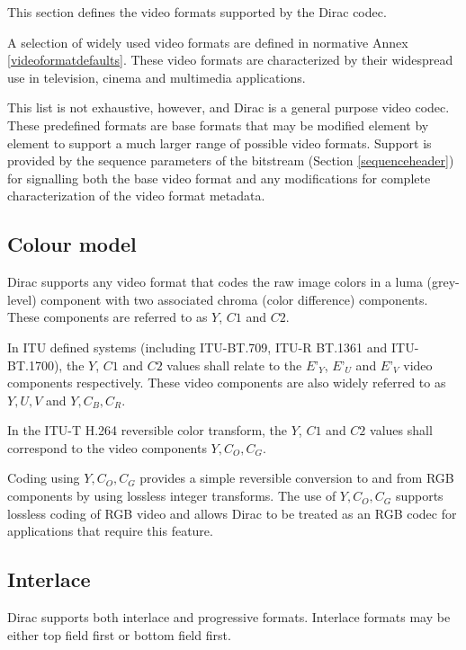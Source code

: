 This section defines the video formats supported by the Dirac codec.

A selection of widely used video formats are defined in normative Annex 
\ref{videoformatdefaults}. These video formats are characterized by
their widespread use in television, cinema and multimedia applications.

This list is not exhaustive, however, and Dirac is a general purpose video 
codec. These predefined formats are base formats that may be modified element by
element to support a much larger range of possible video formats. Support
is provided by the sequence parameters of the bitstream (Section 
\ref{sequenceheader}) for signalling both the base video format and
any modifications for complete characterization of the video format metadata.


\subsection{Colour model}

Dirac supports any video format that codes the raw image colors in a luma 
(grey-level) component with two associated chroma (color difference) components.
 These components are referred to as $Y$, $C1$ and $C2$.

In ITU defined systems (including ITU-BT.709, ITU-R BT.1361 and ITU-BT.1700), 
the $Y$, $C1$ and $C2$ values shall relate to the $E’_Y$, $E’_U$ and $E’_V$ 
video components respectively. These video components are also widely referred 
to as $Y, U, V$ and $Y, C_B , C_R$.

In the ITU-T H.264 reversible color transform, the $Y$, $C1$ and $C2$ values 
shall correspond to the video components $Y, C_O, C_G$.

\begin{informative}
Coding using $Y, C_O, C_G$ provides a simple reversible conversion to and from
RGB components by using lossless integer transforms. The use of $Y, C_O, C_G$
supports lossless coding of RGB video and allows Dirac to be treated as an RGB
codec for applications that require this feature.
\end{informative}

\subsection{Interlace}

Dirac supports both interlace and progressive formats. Interlace formats may be
 either top field first or bottom field first.

